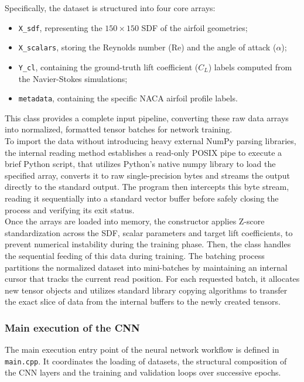 Specifically, the dataset is structured into four core arrays:
\begin{itemize}
    \item[-] \texttt{X\_sdf}, representing the $150 \times 150$ SDF of the airfoil geometries;
    \item[-] \texttt{X\_scalars}, storing the Reynolds number ($\mathrm{Re}$) and the angle of attack ($\alpha$);
    \item[-] \texttt{Y\_cl}, containing the ground-truth lift coefficient ($C_L$) labels computed from the Navier-Stokes simulations;
    \item[-] \texttt{metadata}, containing the specific NACA airfoil profile labels.
\end{itemize}
This class provides a complete input pipeline, converting these raw data arrays into normalized, formatted tensor batches for network training.\\

To import the data without introducing heavy external \cpp NumPy parsing libraries, the internal reading method establishes a read-only POSIX pipe to execute a brief Python script, that utilizes Python's native numpy library to load the specified array, converts it to raw single-precision bytes and streams the output directly to the standard output. The \cpp program then intercepts this byte stream, reading it sequentially into a standard vector buffer before safely closing the process and verifying its exit status.\\

Once the arrays are loaded into memory, the constructor applies Z-score standardization across the SDF, scalar parameters and target lift coefficients, to prevent numerical instability during the training phase. Then, the class handles the sequential feeding of this data during training. The batching process partitions the normalized dataset into mini-batches by maintaining an internal cursor that tracks the current read position. For each requested batch, it allocates new tensor objects and utilizes standard library copying algorithms to transfer the exact slice of data from the internal buffers to the newly created tensors.

\subsubsection{Main execution of the CNN}

The main execution entry point of the neural network workflow is defined in \texttt{main.cpp}. It coordinates the loading of datasets, the structural composition of the CNN layers and the training and validation loops over successive epochs.\\

